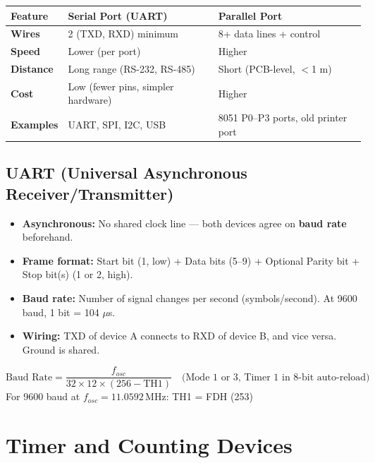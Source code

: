 \documentclass[12pt,a4paper]{article}
\renewcommand{\arraystretch}{1.45}
\begin{document}
\par\noindent
{\renewcommand{\arraystretch}{1.55}%
\begin{tabularx}{\linewidth}{|B{3.0cm}|Y|Y|}
\hline
\textbf{Feature} & \textbf{Serial Port (UART)} & \textbf{Parallel Port} \\
\hline
\textbf{Wires} & 2 (TXD, RXD) minimum & 8+ data lines + control \\
\hline
\textbf{Speed} & Lower (per port) & Higher \\
\hline
\textbf{Distance} & Long range (RS-232, RS-485) & Short (PCB-level, $<$1 m) \\
\hline
\textbf{Cost} & Low (fewer pins, simpler hardware) & Higher \\
\hline
\textbf{Examples} & UART, SPI, I2C, USB & 8051 P0--P3 ports, old printer port \\
\hline
\end{tabularx}}

\subsection{UART (Universal Asynchronous Receiver/Transmitter)}
\begin{itemize}[leftmargin=*, itemsep=3pt]
  \item \textbf{Asynchronous:} No shared clock line --- both devices agree on \textbf{baud rate} beforehand.
  \item \textbf{Frame format:} Start bit (1, low) + Data bits (5--9) + Optional Parity bit + Stop bit(s) (1 or 2, high).
  \item \textbf{Baud rate:} Number of signal changes per second (symbols/second). At 9600 baud, 1 bit = 104 $\mu$s.
  \item \textbf{Wiring:} TXD of device A connects to RXD of device B, and vice versa. Ground is shared.
\end{itemize}

\begin{tcolorbox}[formulabox, title={\textbf{UART Baud Rate Formula (8051)}}]
\[
\text{Baud Rate} = \frac{f_{osc}}{32 \times 12 \times (256 - \text{TH1})}
\quad \text{(Mode 1 or 3, Timer 1 in 8-bit auto-reload)}
\]
For 9600 baud at $f_{osc} = 11.0592\,\text{MHz}$: \quad TH1 = FDH (253)
\end{tcolorbox}

\section{Timer and Counting Devices}
\end{document}
